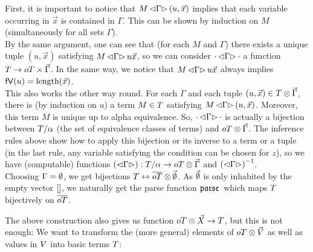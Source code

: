 \documentclass[submission,copyright,creativecommons]{eptcs}
\begin{document}
First, it is important to notice that $M \, { \mathord{\lhd} {\Gamma} \mathord{\rhd} } \, (u, \vec x)$ implies that each variable occurring in $\vec x$ is contained in $\Gamma$. This can be shown by induction on $M$ (simultaneously for all sets $\Gamma$). \\
By the same argument, one can see that (for each $M$ and $\Gamma$) there exists a unique tuple $(u, \vec x)$ satisfying $M \, { \mathord{\lhd} {\Gamma} \mathord{\rhd} } \, u  \vec x$, so we can consider $\cdot \, { \mathord{\lhd} {\Gamma} \mathord{\rhd} } \, \cdot$ a function $T \rightarrow oT \times \vec \Gamma$. In the same way, we notice that $M \, { \mathord{\lhd} {\Gamma} \mathord{\rhd} } \, u  \vec x$ always implies $\mathsf{fV}(u) = \mbox{length}(\vec x)$. \\
This also works the other way round. For each $\Gamma$ and each tuple $(u, \vec x) \in T \otimes \vec \Gamma$, there is (by induction on $u$) a term $M \in T$ satisfying $M \, { \mathord{\lhd} {\Gamma} \mathord{\rhd} } \, (u, \vec x)$. Moreover, this term $M$ is unique up to alpha equivalence. So, $\cdot \, { \mathord{\lhd} {\Gamma} \mathord{\rhd} } \, \cdot$ is actually a bijection between $T / \alpha$ (the set of equivalence classes of terms) and $oT \otimes \vec \Gamma$. The inference rules above show how to apply this bijection or its inverse to a term or a tuple (in the last rule, any variable satisfying the condition can be chosen for $z$), so we have (computable) functions $\left(\mathord{\lhd} {\Gamma} \mathord{\rhd}\right) : T / \alpha \rightarrow oT \otimes \vec \Gamma$ and $\left(\mathord{\lhd} {\Gamma} \mathord{\rhd}\right) ^{-1}$. 
\\
Choosing $\Gamma = \emptyset$, we get bijections $T \leftrightarrow \overline{oT} \otimes {\vec {\emptyset}}$. As $\vec {\emptyset}$ is only inhabited by the empty vector $[]$, we naturally get the parse function $\mathfrak {parse } \,$ which maps $T$ bijectively on $\overline{oT}$.



The above construction also gives us function $oT \otimes \vec {X} \rightarrow T$, but this is not enough: We want to transform the (more general) elements of $oT \otimes \vec {V}$ as well as values in $V$ into basic terms $T$:
\end{document}
